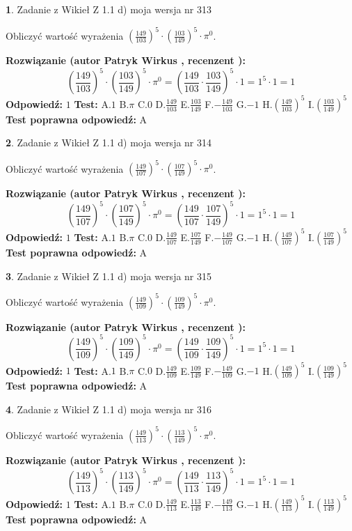 \documentclass[12pt, a4paper]{article}
\theoremstyle{definition} %
\newtheorem{zad}{}
\newcommand{\zadStart}[1]{\begin{zad}#1\newline}
\newcommand{\zadStop}{\end{zad}}
\newcommand{\rozwStart}[2]{\noindent \textbf{Rozwiązanie (autor #1 , recenzent #2): }\newline}
\newcommand{\rozwStop}{\newline}
\newcommand{\odpStart}{\noindent \textbf{Odpowiedź:}\newline}
\newcommand{\odpStop}{\newline}
\newcommand{\testStart}{\noindent \textbf{Test:}\newline}
\newcommand{\testStop}{\newline}
\newcommand{\kluczStart}{\noindent \textbf{Test poprawna odpowiedź:}\newline}
\newcommand{\kluczStop}{\newline}
\begin{document}
\zadStart{Zadanie z Wikieł Z 1.1 d) moja wersja nr 313}

Obliczyć wartość wyrażenia $(\frac{149}{103})^{5} \cdot (\frac{103}{149})^{5} \cdot \pi^{0}$.
\zadStop
\rozwStart{Patryk Wirkus}{}
$$(\frac{149}{103})^{5} \cdot (\frac{103}{149})^{5} \cdot \pi^{0} = (\frac{149}{103} \cdot \frac{103}{149})^{5} \cdot 1 = 1^{5} \cdot 1 = 1$$
\rozwStop
\odpStart
$1$
\odpStop
\testStart
A.$1$ B.$\pi$ C.$0$ D.$\frac{149}{103}$ E.$\frac{103}{149}$
F.$-\frac{149}{103}$ G.$-1$
H.$(\frac{149}{103})^{5}$
I.$(\frac{103}{149})^{5}$
\testStop
\kluczStart
A
\kluczStop



\zadStart{Zadanie z Wikieł Z 1.1 d) moja wersja nr 314}

Obliczyć wartość wyrażenia $(\frac{149}{107})^{5} \cdot (\frac{107}{149})^{5} \cdot \pi^{0}$.
\zadStop
\rozwStart{Patryk Wirkus}{}
$$(\frac{149}{107})^{5} \cdot (\frac{107}{149})^{5} \cdot \pi^{0} = (\frac{149}{107} \cdot \frac{107}{149})^{5} \cdot 1 = 1^{5} \cdot 1 = 1$$
\rozwStop
\odpStart
$1$
\odpStop
\testStart
A.$1$ B.$\pi$ C.$0$ D.$\frac{149}{107}$ E.$\frac{107}{149}$
F.$-\frac{149}{107}$ G.$-1$
H.$(\frac{149}{107})^{5}$
I.$(\frac{107}{149})^{5}$
\testStop
\kluczStart
A
\kluczStop



\zadStart{Zadanie z Wikieł Z 1.1 d) moja wersja nr 315}

Obliczyć wartość wyrażenia $(\frac{149}{109})^{5} \cdot (\frac{109}{149})^{5} \cdot \pi^{0}$.
\zadStop
\rozwStart{Patryk Wirkus}{}
$$(\frac{149}{109})^{5} \cdot (\frac{109}{149})^{5} \cdot \pi^{0} = (\frac{149}{109} \cdot \frac{109}{149})^{5} \cdot 1 = 1^{5} \cdot 1 = 1$$
\rozwStop
\odpStart
$1$
\odpStop
\testStart
A.$1$ B.$\pi$ C.$0$ D.$\frac{149}{109}$ E.$\frac{109}{149}$
F.$-\frac{149}{109}$ G.$-1$
H.$(\frac{149}{109})^{5}$
I.$(\frac{109}{149})^{5}$
\testStop
\kluczStart
A
\kluczStop



\zadStart{Zadanie z Wikieł Z 1.1 d) moja wersja nr 316}

Obliczyć wartość wyrażenia $(\frac{149}{113})^{5} \cdot (\frac{113}{149})^{5} \cdot \pi^{0}$.
\zadStop
\rozwStart{Patryk Wirkus}{}
$$(\frac{149}{113})^{5} \cdot (\frac{113}{149})^{5} \cdot \pi^{0} = (\frac{149}{113} \cdot \frac{113}{149})^{5} \cdot 1 = 1^{5} \cdot 1 = 1$$
\rozwStop
\odpStart
$1$
\odpStop
\testStart
A.$1$ B.$\pi$ C.$0$ D.$\frac{149}{113}$ E.$\frac{113}{149}$
F.$-\frac{149}{113}$ G.$-1$
H.$(\frac{149}{113})^{5}$
I.$(\frac{113}{149})^{5}$
\testStop
\kluczStart
A
\kluczStop
\end{document}
